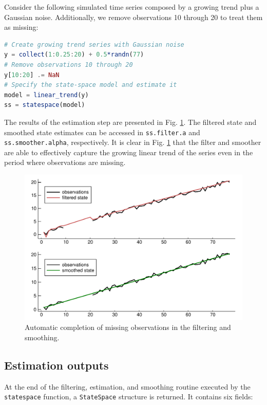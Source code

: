 \documentclass{juliacon}
\begin{document}
Consider the following simulated time series composed by a growing trend plus a Gaussian noise. Additionally, we remove observations 10 through 20 to treat them as missing:
%
\begin{lstlisting}[language = Julia]
# Create growing trend series with Gaussian noise
y = collect(1:0.25:20) + 0.5*randn(77)
# Remove observations 10 through 20
y[10:20] .= NaN
# Specify the state-space model and estimate it
model = linear_trend(y)
ss = statespace(model)
\end{lstlisting}
%
The results of the estimation step are presented in Fig. \ref{fig:missing_observations}. The filtered state and smoothed state estimates can be accessed in \texttt{ss.filter.a} and \texttt{ss.smoother.alpha}, respectively. It is clear in Fig. \ref{fig:missing_observations} that the filter and smoother are able to effectively capture the growing linear trend of the series even in the period where observations are missing.
%
\begin{figure}[h]
	\centering
	\includegraphics[width=\columnwidth]{Figures/missing_obs.pdf}
	\caption{Automatic completion of missing observations in the filtering and smoothing.}
	\label{fig:missing_observations}
\end{figure}

\subsection{Estimation outputs}

At the end of the filtering, estimation, and smoothing routine executed by the \texttt{statespace} function, a \texttt{StateSpace} structure is returned. It contains six fields:
\end{document}
